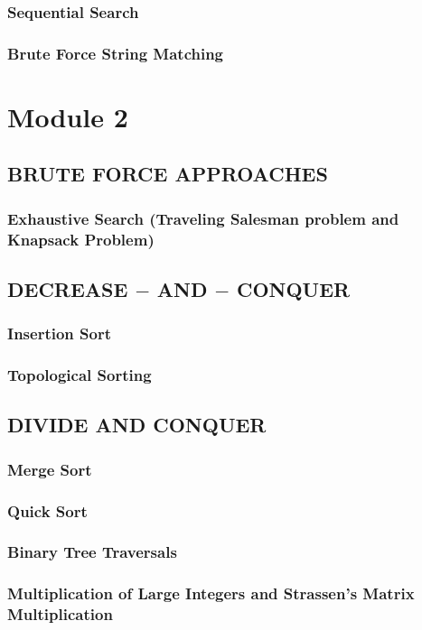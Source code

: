 \documentclass{article}
\begin{document}
	\subsubsection{Sequential Search}
	\subsubsection{Brute Force String Matching}
	\newpage

	\section{Module 2}
	\subsection{BRUTE FORCE APPROACHES}
	\subsubsection{Exhaustive Search (Traveling Salesman problem and Knapsack Problem)}

	\subsection{DECREASE $-$ AND $-$ CONQUER}
	\subsubsection{Insertion Sort}
	\subsubsection{Topological Sorting}

	\subsection{DIVIDE AND CONQUER}
	\subsubsection{Merge Sort}
	\subsubsection{Quick Sort}
	\subsubsection{Binary Tree Traversals}
	\subsubsection{Multiplication of Large Integers and Strassen's Matrix Multiplication}
	\newpage
\end{document}

